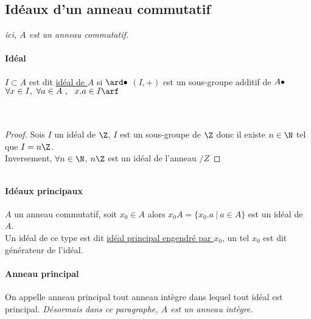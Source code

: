 	\subsection{Idéaux d'un anneau commutatif}
		\textit{ici, $A$ est un anneau commutatif.}\\
		\traitd
		\paragraph{Idéal}
			$I\subset A$ est dit \uline{idéal de $A$} si $\ard 
			\bullet$ $(I,+)$ est un sous-groupe additif de $A \\
			\bullet$ $\forall x\in I,~\forall a\in A ~,~~x.a\in I \arf$ \trait
		\vspace*{0.5cm} \\ 
		\vspace*{0.5cm} \\ 
		\vspace*{0.5cm} \\ 
		\begin{proof}
		Sois $I$ un idéal de $\Z$, $I$ est un sous-groupe de $\Z$ donc il existe $n\in\N$ tel que $I=n\Z$.\\
		Inversement, $\forall n\in\N $, $n\Z$ est un idéal de l'anneau $/Z$
		\end{proof} ${}$ \traitd
		\paragraph{Idéaux principaux} ${}$ \\
			$A$ un anneau commutatif, soit $x_0 \in A$ alors $x_0A = \{ x_0.a ~|~a\in A\}$ est un idéal de $A$.\\
			Un idéal de ce type est dit \uline{idéal principal engendré par $x_0$}, un tel $x_0$ est dit générateur de l'idéal. \trait ${}$ \vspace*{-0.7cm} \traitd
		\paragraph{Anneau principal} ${}$ \\
			On appelle anneau principal tout anneau intègre dans lequel tout idéal est principal. \trait
		\textit{Désormais dans ce paragraphe, $A$ est un anneau intègre.}
		\traitd

